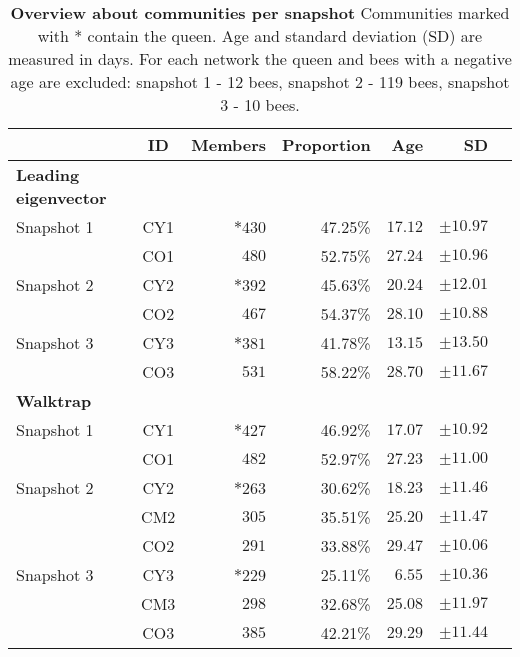 \begin{table}
\small
\centering
\caption[Overview about communities]{\textbf{Overview about communities per snapshot} Communities marked with * contain the queen. Age and standard deviation (SD) are measured in days. For each network the queen and bees with a negative age are excluded: snapshot 1 - 12 bees, snapshot 2 - 119 bees, snapshot 3 - 10 bees.}
\label{tab:communities}
\vspace*{5mm}
\begin{tabular}{lcrrrrr}
	\toprule
	{}  & ID & Members & Proportion & Age & SD\\
	\midrule

	\textbf{Leading eigenvector} &&&&&\\
	\midrule 
	Snapshot 1  & CY1 & $*430$  & 47.25\% & $17.12$ & $\pm10.97$ \\
	                 & CO1 & $480$   & 52.75\% & $27.24$ & $\pm10.96$ \\
	\midrule   							
	Snapshot 2  & CY2 & $*392$  & 45.63\% & $20.24$ & $\pm12.01$ \\
	                 & CO2 & $467$   & 54.37\% & $28.10$ & $\pm10.88$ \\
	\midrule  
	Snapshot 3  & CY3 & $*381$  & 41.78\% & $13.15$ & $\pm13.50$ \\
	                 & CO3 & $531$   & 58.22\% & $28.70$ & $\pm11.67$ \\
    \midrule

    \textbf{Walktrap} &&&&&\\
    \midrule 
	Snapshot 1 & CY1 & $*427$ & 46.92\% & $17.07$ & $\pm10.92$\\
	                & CO1 & $482$  & 52.97\% & $27.23$ & $\pm11.00$\\
	\midrule
	Snapshot 2 & CY2 & $*263$ & 30.62\% & $18.23$ & $\pm11.46$\\
				    & CM2 & $305$  & 35.51\% & $25.20$ & $\pm11.47$\\
				    & CO2 & $291$  & 33.88\% & $29.47$ & $\pm10.06$\\            
	\midrule
	Snapshot 3 & CY3 & $*229$  & 25.11\% & $6.55$  & $\pm10.36$\\
					& CM3 & $298$  & 32.68\% & $25.08$ & $\pm11.97$\\
					& CO3 & $385$  & 42.21\% & $29.29$ & $\pm11.44$\\
	\bottomrule
\end{tabular}
\end{table}
